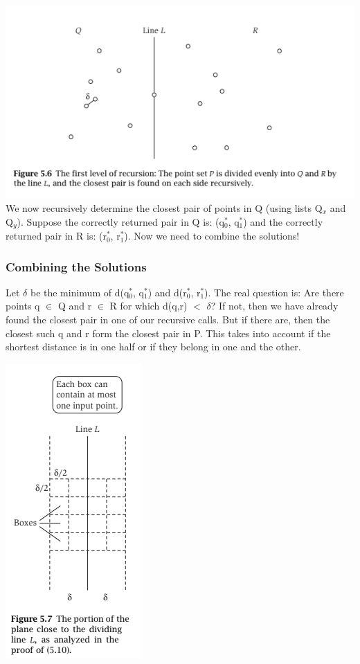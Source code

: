 \documentclass{article}
\begin{document}
\includegraphics[]{figures/fig3.png}\\

We now recursively determine the closest pair of points in Q (using lists Q$_x$ and Q$_y$). Suppose the correctly returned pair in Q is: (q$^*_0$, q$^*_1$) and the correctly returned pair in R is: (r$^*_0$, r$^*_1$). Now we need to combine the solutions!

\subsubsection{Combining the Solutions}
Let $\delta$ be the minimum of d(q$^*_0$, q$^*_1$) and d(r$^*_0$, r$^*_1$). The real question is: Are there points q $\in$ Q and r $\in$ R for which d(q,r) $<$ $\delta$? If not, then we have already found the closest pair in one of our recursive calls. But if there are, then the closest such q and r form the closest pair in P. This takes into account if the shortest distance is in one half or if they belong in one and the other.\\

\begin{center}
    \includegraphics[]{figures/fig4.png}
\end{center}
\end{document}
